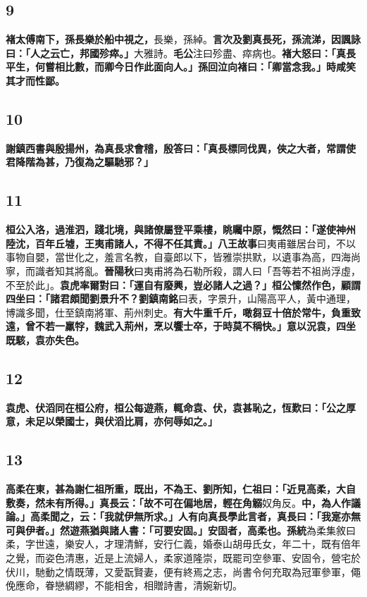 \subsection*{9}

\textbf{褚太傅南下，孫長樂於船中視之，}{\footnotesize 長樂，孫綽。}\textbf{言次及劉真長死，孫流涕，因諷詠曰：「人之云亡，邦國殄瘁。」}{\footnotesize 大雅詩。\textbf{毛公}注曰殄盡、瘁病也。}\textbf{褚大怒曰：「真長平生，何嘗相比數，而卿今日作此面向人。」孫回泣向褚曰：「卿當念我。」時咸笑其才而性鄙。}

\subsection*{10}

\textbf{謝鎮西書與殷揚州，為真長求會稽，殷答曰：「真長標同伐異，俠之大者，常謂使君降階為甚，乃復為之驅馳邪？」}

\subsection*{11}

\textbf{桓公入洛，過淮泗，踐北境，與諸僚屬登平乘樓，眺矚中原，慨然曰：「遂使神州陸沈，百年丘墟，王夷甫諸人，不得不任其責。」}{\footnotesize \textbf{八王故事}曰夷甫雖居台司，不以事物自嬰，當世化之，羞言名教，自臺郎以下，皆雅崇拱默，以遺事為高，四海尚寧，而識者知其將亂。\textbf{晉陽秋}曰夷甫將為石勒所殺，謂人曰「吾等若不祖尚浮虛，不至於此」。}\textbf{袁虎率爾對曰：「運自有廢興，豈必諸人之過？」桓公懍然作色，顧謂四坐曰：「諸君頗聞劉景升不？}{\footnotesize \textbf{劉鎮南銘}曰表，字景升，山陽高平人，黃中通理，博識多聞，仕至鎮南將軍、荊州刺史。}\textbf{有大牛重千斤，噉芻豆十倍於常牛，負重致遠，曾不若一羸牸，魏武入荊州，烹以饗士卒，于時莫不稱快。」意以況袁，四坐既駭，袁亦失色。}

\subsection*{12}

\textbf{袁虎、伏滔同在桓公府，桓公每遊燕，輒命袁、伏，袁甚恥之，恆歎曰：「公之厚意，未足以榮國士，與伏滔比肩，亦何辱如之。」}

\subsection*{13}

\textbf{高柔在東，甚為謝仁祖所重，既出，不為王、劉所知，仁祖曰：「近見高柔，大自敷奏，然未有所得。」真長云：「故不可在偏地居，輕在角䚥}{\footnotesize 奴角反。}\textbf{中，為人作議論。」高柔聞之，云：「我就伊無所求。」人有向真長學此言者，真長曰：「我寔亦無可與伊者。」然遊燕猶與諸人書：「可要安固。」安固者，高柔也。}{\footnotesize \textbf{孫統}為柔集敘曰柔，字世遠，樂安人，才理清鮮，安行仁義，婚泰山胡毋氏女，年二十，既有倍年之覺，而姿色清惠，近是上流婦人，柔家道隆崇，既罷司空參軍、安固令，營宅於伏川，馳動之情既薄，又愛翫賢妻，便有終焉之志，尚書令何充取為冠軍參軍，僶俛應命，眷戀綢繆，不能相舍，相贈詩書，清婉新切。}

